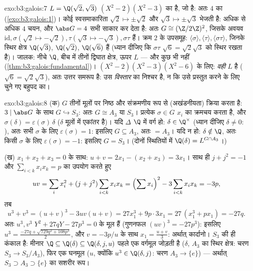 \begin{solution}{exo:b3:galois:7}
$L = \Q(\sqrt2, \sqrt3)$ $(X^2 -
2)(X^2 - 3)$ का  है, जो  है: अतः  $4$ का
 (\cref{exo:b3:galois:1})। कोई स्वसमाकारिता $\sqrt2 \mapsto
\pm\sqrt2$ और $\sqrt3 \mapsto \pm\sqrt3$ भेजती है: अधिक से
अधिक $4$ चयन, और $\abs G = 4$ सभी साकार कर देता है: अतः $G \cong (\Z/2\Z)^2$, जिसके
अवयव $\mathrm{id}, \sigma (\sqrt2 \mapsto -\sqrt2), \tau
(\sqrt3\mapsto-\sqrt3), \sigma\tau$ हैं। क्रम $2$ के उपसमूह: $\langle\sigma\rangle, \langle\tau\rangle,
\langle\sigma\tau\rangle$, जिनके स्थिर क्षेत्र
$\Q(\sqrt3)$, $\Q(\sqrt2)$, $\Q(\sqrt6)$ हैं (ध्यान दीजिए कि $\sigma\tau$ $\sqrt6 =
\sqrt2\sqrt3$ को स्थिर रखता
है)। जालक: नीचे $\Q$, बीच में तीनों द्विघात क्षेत्र, ऊपर $L$ ---
और कुछ भी नहीं (\cref{thm:b3:galois:fundamental})। $(X^2-2)(X^2-3)(X^2-6)$ के लिए:  \emph{वही}
$L$ है ($\sqrt6 =
\sqrt2\sqrt3$), अतः उत्तर समरूप है:  उस \emph{विस्तार}
का निश्चर है, न कि उसे प्रस्तुत करने के लिए चुने गए बहुपद का।
\end{solution}

\begin{solution}{exo:b3:galois:8}
(क) $G$ तीनों मूलों पर निष्ठ और संक्रमणीय रूप से (अखंडनीयता)
क्रिया करता है: $3 \mid \abs G$ के साथ $G \hookrightarrow S_3$: अतः $G
\cong A_3$ या $S_3$। प्रत्येक
$\sigma \in G$ $x_i$ का क्रमचय करता है, और $\sigma(\delta) = \varepsilon(\sigma)\,\delta$ ($\delta$ मूलों में एकांतर
है)। यदि $\Delta$ $\Q$ में वर्ग हो: $\delta \in \Q^\times$ (ध्यान दीजिए $\delta \neq 0$: ),
अतः सभी $\sigma$ के लिए $\varepsilon(\sigma) = 1$: इसलिए $G \subseteq A_3$, अतः $= A_3$। यदि न हो: $\delta \notin \Q$,
अतः किसी $\sigma$ के लिए $\varepsilon(\sigma) = -1$: इसलिए $G = S_3$। (दोनों स्थितियों में
$\Q(\delta)
= L^{G \cap A_3}$।)

(ख) $x_1 + x_2 + x_3 = 0$ के साथ: $u + v = 2x_1 - (x_2 + x_3) =
3x_1$। साथ ही $j + j^2 = -1$ और $\sum_{i<k}x_ix_k = p$ का उपयोग करते हुए
\[
uv = \sum_i x_i^2 + (j + j^2)\sum_{i<k}x_ix_k
= \Bigl(\sum x_i\Bigr)^2 - 3\sum_{i<k}x_ix_k = -3p,
\]
तब
\[
u^3 + v^3 = (u+v)^3 - 3uv(u+v) = 27x_1^3 + 9p\cdot 3x_1
= 27\,(x_1^3 + px_1) = -27q .
\]
अतः $u^3, v^3$ $Y^2 + 27qY - 27p^3 = 0$ के मूल हैं (गुणनफल $(uv)^3 = -27p^3$): इसलिए $u^3 = \frac{-27q +
\sqrt{729q^2 + 108p^3}}2$, और $v =
-3p/u$
के साथ $x_1 = \frac{u + v}3$: अर्थात् कार्दानो। $S_3$ की  ही कंकाल है: मीनार
$\Q \subseteq \Q(\delta) \subseteq \Q(\delta, j, u)$ पहले एक वर्गमूल जोड़ती है ($\delta$, $A_3$ का स्थिर क्षेत्र:
चरण $S_3 \to S_3/A_3$), फिर एक घनमूल ($u$, क्योंकि $u^3
\in \Q(\delta, j)$: चरण $A_3 \to \{e\}$) ---
अर्थात्  $S_3 \supset A_3 \supset \{e\}$ का सशरीर रूप।
\end{solution}

